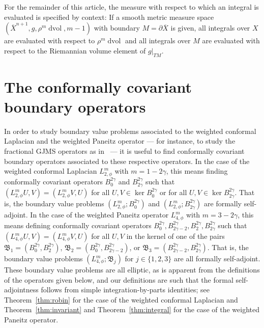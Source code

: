 \documentclass{amsart}
\theoremstyle{definition}
\theoremstyle{remark}
\numberwithin{equation}{section}
\begin{document}
For the remainder of this article, the measure with respect to which an integral is evaluated is specified by context: If a smooth metric measure space $({\overline{X}}^{n+1},g,\rho^m\operatorname{dvol},m-1)$ with boundary $M=\partial{\overline{X}}$ is given, all integrals over $X$ are evaluated with respect to $\rho^m\operatorname{dvol}$ and all integrals over $M$ are evaluated with respect to the Riemannian volume element of $g{\rvert}_{TM}$.

\section{The conformally covariant boundary operators}
\label{sec:boundary}

In order to study boundary value problems associated to the weighted conformal Laplacian and the weighted Paneitz operator --- for instance, to study the fractional GJMS operators as in~\cite{CaseChang2013} --- it is useful to find conformally covariant boundary operators associated to these respective operators.  In the case of the weighted conformal Laplacian $L_{2,\phi}^m$ with $m=1-2\gamma$, this means finding conformally covariant operators $B_0^{2\gamma}$ and $B_{2\gamma}^{2\gamma}$ such that $(L_{2,\phi}^mU,V)=(L_{2,\phi}^mV,U)$ for all $U,V\in\ker B_0^{2\gamma}$ or for all $U,V\in\ker B_{2\gamma}^{2\gamma}$.  That is, the boundary value problems $(L_{2,\phi}^m;B_0^{2\gamma})$ and $(L_{2,\phi}^m;B_{2\gamma}^{2\gamma})$ are formally self-adjoint.  In the case of the weighted Paneitz operator $L_{4,\phi}^m$ with $m=3-2\gamma$, this means defining conformally covariant operators $B_0^{2\gamma}, B_{2\gamma-2}^{2\gamma}, B_2^{2\gamma}, B_{2\gamma}^{2\gamma}$ such that $(L_{4,\phi}^mU,V)=(L_{4,\phi}^mV,U)$ for all $U,V$ in the kernel of one of the pairs ${\mathfrak{B}}_1=(B_0^{2\gamma},B_2^{2\gamma})$, ${\mathfrak{B}}_2=(B_0^{2\gamma},B_{2\gamma-2}^{2\gamma})$, or ${\mathfrak{B}}_3=(B_{2\gamma-2}^{2\gamma},B_{2\gamma}^{2\gamma})$.  That is, the boundary value problems $(L_{4,\phi}^m;{\mathfrak{B}}_j)$ for $j\in\{1,2,3\}$ are all formally self-adjoint.  These boundary value problems are all elliptic, as is apparent from the definitions of the operators given below, and our definitions are such that the formal self-adjointness follows from simple integration-by-parts identities; see Theorem~\ref{thm:robin} for the case of the weighted conformal Laplacian and Theorem~\ref{thm:invariant} and Theorem~\ref{thm:integral} for the case of the weighted Paneitz operator.
\end{document}
